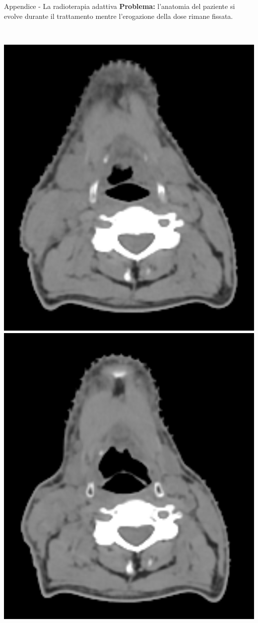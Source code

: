 \documentclass{beamer}
\begin{document}
\begin{frame}{Appendice - La radioterapia adattiva}
\footnotesize
\alert{\bf Problema:} l'anatomia del paziente si evolve durante il trattamento mentre l'erogazione della dose rimane fissata.\\ \vspace{.5cm}
\begin{columns}
\centering
\small
{} \\ \vspace{.1cm}
\includegraphics[width=.8\textwidth]{./img/Slice_INIZIO_c.png}
\centering
\small
{}\\ \vspace{.1cm}
\includegraphics[width=.8\textwidth]{./img/Slice_FINE_c.png}
\end{columns}
\vspace{.3cm}


\end{frame}
\end{document}
